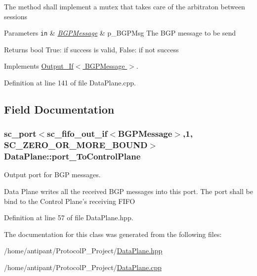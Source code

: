 The method shall implement a mutex that takes care of the arbitraton between sessions 
\begin{DoxyParams}[1]{Parameters}
\mbox{\tt in}  & {\em \hyperlink{classBGPMessage}{B\-G\-P\-Message}} & p\-\_\-\-B\-G\-P\-Msg The B\-G\-P message to be send \\
\hline
\end{DoxyParams}
\begin{DoxyReturn}{Returns}
bool True\-: if success is valid, False\-: if not success 
\end{DoxyReturn}


Implements \hyperlink{classOutput__If_aeef0f3dff2d02e85375e914e83140602}{Output\-\_\-\-If$<$ B\-G\-P\-Message $>$}.



Definition at line 141 of file Data\-Plane.\-cpp.



\subsection{Field Documentation}
\hypertarget{classDataPlane_a3e86cb0494125c28df71313925463b61}{
\subsubsection[{port\-\_\-\-To\-Control\-Plane}]{\setlength{\rightskip}{0pt plus 5cm}sc\-\_\-port$<$sc\-\_\-fifo\-\_\-out\-\_\-if$<${\bf B\-G\-P\-Message}$>$,1, S\-C\-\_\-\-Z\-E\-R\-O\-\_\-\-O\-R\-\_\-\-M\-O\-R\-E\-\_\-\-B\-O\-U\-N\-D$>$ Data\-Plane\-::port\-\_\-\-To\-Control\-Plane}}\label{classDataPlane_a3e86cb0494125c28df71313925463b61}


Output port for B\-G\-P messages. 

Data Plane writes all the received B\-G\-P messages into this port. The port shall be bind to the Control Plane's receiving F\-I\-F\-O 

Definition at line 57 of file Data\-Plane.\-hpp.



The documentation for this class was generated from the following files\-:\begin{DoxyCompactItemize}
\item 
/home/antipant/\-Protocol\-P\-\_\-\-Project/\hyperlink{DataPlane_8hpp}{Data\-Plane.\-hpp}\item 
/home/antipant/\-Protocol\-P\-\_\-\-Project/\hyperlink{DataPlane_8cpp}{Data\-Plane.\-cpp}\end{DoxyCompactItemize}
